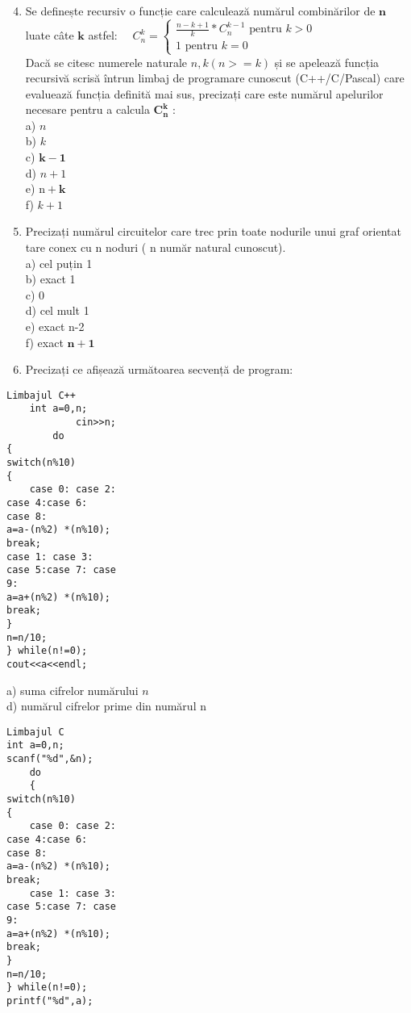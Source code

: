 \begin{enumerate}
  \setcounter{enumi}{3}
  \item Se definește recursiv o funcție care calculează numărul combinărilor de $\mathbf{n}$ luate câte $\mathbf{k}$ astfel: $\quad C_{n}^{k}=\left\{\begin{array}{c}\frac{n-k+1}{k} * C_{n}^{k-1} \text { pentru } k>0 \\ 1 \text { pentru } k=0\end{array}\right.$\\
Dacă se citesc numerele naturale $n, k(n>=k)$ și se apelează funcția recursivă scrisă întrun limbaj de programare cunoscut (C++/C/Pascal) care evaluează funcția definită mai sus, precizați care este numărul apelurilor necesare pentru a calcula $\boldsymbol{C}_{\boldsymbol{n}}^{\boldsymbol{k}}$ :\\
a) $n$\\
b) $k$\\
c) $\mathbf{k - 1}$\\
d) $n+1$\\
e) $\mathrm{n}+\mathbf{k}$\\
f) $k+1$
  \item Precizați numărul circuitelor care trec prin toate nodurile unui graf orientat tare conex cu n noduri ( n număr natural cunoscut).\\
a) cel puțin 1\\
b) exact 1\\
c) 0\\
d) cel mult 1\\
e) exact n-2\\
f) exact $\mathbf{n + 1}$
  \item Precizați ce afișează următoarea secvență de program:
\end{enumerate}

\begin{verbatim}
Limbajul C++
    int a=0,n;
            cin>>n;
        do
{
switch(n%10)
{
    case 0: case 2:
case 4:case 6:
case 8:
a=a-(n%2) *(n%10);
break;
case 1: case 3:
case 5:case 7: case
9:
a=a+(n%2) *(n%10);
break;
}
n=n/10;
} while(n!=0);
cout<<a<<endl;
\end{verbatim}

a) suma cifrelor numărului $n$\\
d) numărul cifrelor prime din numărul n

\begin{verbatim}
Limbajul C
int a=0,n;
scanf("%d",&n);
    do
    {
switch(n%10)
{
    case 0: case 2:
case 4:case 6:
case 8:
a=a-(n%2) *(n%10);
break;
    case 1: case 3:
case 5:case 7: case
9:
a=a+(n%2) *(n%10);
break;
}
n=n/10;
} while(n!=0);
printf("%d",a);
\end{verbatim}

